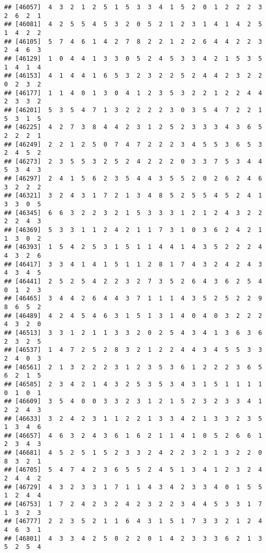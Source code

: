 \documentclass[
]{article}
\begin{document}
\begin{verbatim}
## [46057]  4  3  2  1  2  5  1  5  3  3  4  1  5  2  0  1  2  2  2  3  2  6  2  1
## [46081]  4  2  5  5  4  5  3  2  0  5  2  1  2  3  1  4  1  4  2  5  1  4  2  2
## [46105]  5  7  4  6  1  4  2  7  8  2  2  1  2  2  6  4  4  2  2  3  2  4  6  3
## [46129]  1  0  4  4  1  3  3  0  5  2  4  5  3  3  4  2  1  5  3  5  1  4  1  4
## [46153]  4  1  4  4  1  6  5  3  2  3  2  2  5  2  4  4  2  3  2  2  0  2  3  2
## [46177]  1  1  4  0  1  3  0  4  1  2  3  5  3  2  2  1  2  2  4  4  2  3  3  2
## [46201]  5  3  5  4  7  1  3  2  2  2  2  3  0  3  5  4  7  2  2  1  5  3  1  5
## [46225]  4  2  7  3  8  4  4  2  3  1  2  5  2  3  3  3  4  3  6  5  2  2  2  1
## [46249]  2  2  1  2  5  0  7  4  7  2  2  2  3  4  5  5  3  6  5  3  2  4  5  2
## [46273]  2  3  5  5  3  2  5  2  4  2  2  2  0  3  3  7  5  3  4  4  5  3  4  3
## [46297]  2  4  1  5  6  2  3  5  4  4  3  5  5  2  0  2  6  2  4  6  3  2  2  2
## [46321]  3  2  4  3  1  7  2  1  3  4  8  5  2  5  5  4  5  2  4  1  3  3  0  5
## [46345]  6  6  3  2  2  3  2  1  5  3  3  3  1  2  1  2  4  3  2  2  2  2  4  3
## [46369]  5  3  3  1  1  2  4  2  1  1  7  3  1  0  3  6  2  4  2  1  1  3  0  2
## [46393]  1  5  4  2  5  3  1  5  1  1  4  4  1  4  3  5  2  2  2  4  4  3  2  6
## [46417]  3  3  4  1  4  1  5  1  1  2  8  1  7  4  3  2  4  2  4  3  4  3  4  5
## [46441]  2  5  2  5  4  2  2  3  2  7  3  5  2  6  4  3  6  2  5  4  0  1  2  3
## [46465]  3  4  4  2  6  4  4  3  7  1  1  1  4  3  5  2  5  2  2  9  8  6  5  2
## [46489]  4  2  4  5  4  6  3  1  5  1  3  1  4  0  4  0  3  2  2  2  4  3  2  0
## [46513]  3  3  1  2  1  1  3  3  2  0  2  5  4  3  4  1  3  6  3  6  2  3  2  5
## [46537]  1  4  7  2  5  2  8  3  2  1  2  2  4  4  3  4  5  5  3  3  2  4  0  3
## [46561]  2  1  3  2  2  2  3  1  2  3  5  3  6  1  2  2  2  3  6  5  6  2  1  5
## [46585]  2  3  4  2  1  4  3  2  5  3  5  3  4  3  1  5  1  1  1  1  0  1  0  1
## [46609]  3  5  4  0  0  3  3  2  3  1  2  1  5  2  3  2  3  3  4  1  2  2  4  3
## [46633]  3  2  4  2  3  1  1  2  2  1  3  3  4  2  1  3  3  2  3  5  1  3  4  6
## [46657]  4  6  3  2  4  3  6  1  6  2  1  1  4  1  0  5  2  6  6  1  2  3  4  3
## [46681]  4  5  2  5  1  5  2  3  3  2  4  2  2  3  2  1  3  2  2  0  8  3  2  1
## [46705]  5  4  7  4  2  3  6  5  5  2  4  5  1  3  4  1  2  3  2  4  2  4  4  2
## [46729]  4  3  2  3  3  1  7  1  1  4  3  4  2  3  3  4  0  1  5  5  1  2  4  4
## [46753]  1  7  2  4  2  3  2  4  2  3  2  2  3  4  4  5  3  3  1  7  1  3  2  3
## [46777]  2  2  3  5  2  1  1  6  4  3  1  5  1  7  3  3  2  1  2  4  4  6  3  1
## [46801]  4  3  3  4  2  5  0  2  2  0  1  4  2  3  3  3  6  2  1  3  5  2  5  4

\end{verbatim}
\end{document}
